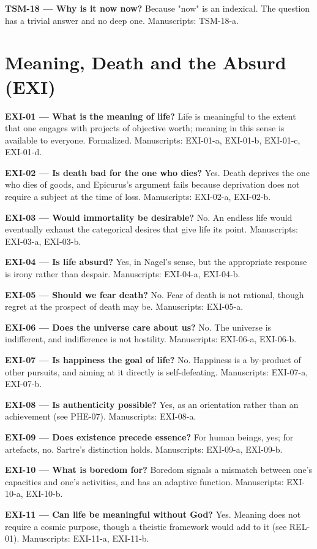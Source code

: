 \documentclass[10pt]{article}
\begin{document}
\textbf{TSM-18 --- Why is it now now?} Because "now" is an indexical. The question has a trivial answer and no deep one. Manuscripts: TSM-18-a.

\section*{Meaning, Death and the Absurd (EXI)}
\textbf{EXI-01 --- What is the meaning of life?} Life is meaningful to the extent that one engages with projects of objective worth; meaning in this sense is available to everyone. Formalized. Manuscripts: EXI-01-a, EXI-01-b, EXI-01-c, EXI-01-d.

\textbf{EXI-02 --- Is death bad for the one who dies?} Yes. Death deprives the one who dies of goods, and Epicurus's argument fails because deprivation does not require a subject at the time of loss. Manuscripts: EXI-02-a, EXI-02-b.

\textbf{EXI-03 --- Would immortality be desirable?} No. An endless life would eventually exhaust the categorical desires that give life its point. Manuscripts: EXI-03-a, EXI-03-b.

\textbf{EXI-04 --- Is life absurd?} Yes, in Nagel's sense, but the appropriate response is irony rather than despair. Manuscripts: EXI-04-a, EXI-04-b.

\textbf{EXI-05 --- Should we fear death?} No. Fear of death is not rational, though regret at the prospect of death may be. Manuscripts: EXI-05-a.

\textbf{EXI-06 --- Does the universe care about us?} No. The universe is indifferent, and indifference is not hostility. Manuscripts: EXI-06-a, EXI-06-b.

\textbf{EXI-07 --- Is happiness the goal of life?} No. Happiness is a by-product of other pursuits, and aiming at it directly is self-defeating. Manuscripts: EXI-07-a, EXI-07-b.

\textbf{EXI-08 --- Is authenticity possible?} Yes, as an orientation rather than an achievement (see PHE-07). Manuscripts: EXI-08-a.

\textbf{EXI-09 --- Does existence precede essence?} For human beings, yes; for artefacts, no. Sartre's distinction holds. Manuscripts: EXI-09-a, EXI-09-b.

\textbf{EXI-10 --- What is boredom for?} Boredom signals a mismatch between one's capacities and one's activities, and has an adaptive function. Manuscripts: EXI-10-a, EXI-10-b.

\textbf{EXI-11 --- Can life be meaningful without God?} Yes. Meaning does not require a cosmic purpose, though a theistic framework would add to it (see REL-01). Manuscripts: EXI-11-a, EXI-11-b.
\end{document}
